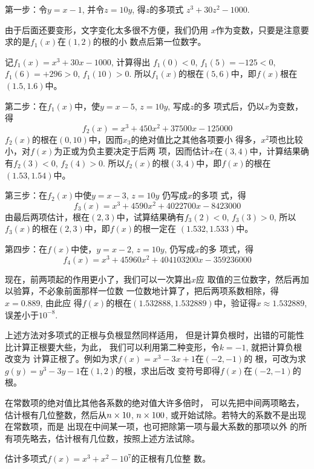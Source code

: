 \begin{solution}
第一步：令$y=x-1$, 并令$z=10y$, 得$z$的多项式
$z^3+30z^2-1000$.

由于后面还要变形，文字变化太多很不方便，我们仍用
$x$作为变数，只要是注意要求的是$f_1(x)$在$(1,2)$的根的小
数点后第一位数字。

记$f_1(x)=x^3+30x-1000$, 计算得出
$f_1(0)<0$, $f_1(5)=-125<0$, $f_1(6)=+296>0$, $f_1(10)>0$.
所以$f_1(x)$的根在$(5,6)$中，即$f(x)$根在$(1.5,1.6)$中。

第二步：在$f_1(x)$中，使$y=x-5$, $z=10y$, 写成$z$的多
项式后，仍以$x$为变数，得
\[f_2(x)=x^3+450x^2+37500x-125000\]
$f_2(x)$的根在$(0,10)$中，因而$x_3$的绝对值比之其他各项要小
得多，$x^2$项也比较小，对$f(x)$为正或为负主要决定于后两
项，因而估计$x$在$(3,4)$中，计算结果确有$f_2(3)<0$, 
$f_2(4)>0$. 所以$f_2(x)$的根$(3,4)$中，即$f(x)$的根在
$(1.53,1.54)$中。

第三步：在$f_2(x)$中使$y=x-3$, $z=10y$ 仍写成$x$的多项
式，得
\[f_3(x)=x^3+4590x^2+4022700x-8423000\]
由最后两项估计，根在$(2,3)$中，试算结果确有$f_3(2)<0$, 
$f_3(3)>0$, 所以$f_3(x)$的根在$(2,3)$中，即$f(x)$的根一定在
$(1.532,1.533)$中。

第四步：在$f(x)$中使，$y=x-2$, $z=10y$, 仍写成$x$的多
项式，得
\[f_4(x)=x^3+45960x^2+404103200x-359236000\]

现在，前两项起的作用更小了，我们可以一次算出$x$应
取值的三位数字，然后再加以验算，不必象前面那样一位数
一位数地计算了，把后两项系数相除，得$x=0.889$, 由此应
得$f(x)$的根在$(1.532888,1.532889)$中，验证得$x\approx 1.532889$,
误差小于$10^{-8}$.
\end{solution}

\begin{rmk}
    上述方法对多项式的正根与负根显然同样适用，
但是计算负根时，出错的可能性比计算正根要大些，为此，
我们可以利用第二种变形，令$k=-1$, 就把计算负根改变为
计算正根了。例如为求$f(x)=x^3-3x+1$在$(-2,-1)$的
根，可改为求$g(y)=y^3-3y-1$在$(1,2)$的根，求出后改
变符号即得$f(x)$在$(-2,-1)$的根。

在常数项的绝对值比其他各系数的绝对值大许多倍时，
可以先把中间两项略去，估计根有几位整数，然后从$n\times10$,
$n\times100$, 或开始试除。若特大的系数不是出现在常数项，而是
出现在中间某一项，也可把除第一项与最大系数的那项以外
的所有项先略去，估计根有几位数，按照上述方法试除。
\end{rmk}

\begin{example}
    估计多项式$f(x)=x^3+x^2-10^7$的正根有几位整
数。
\end{example}

